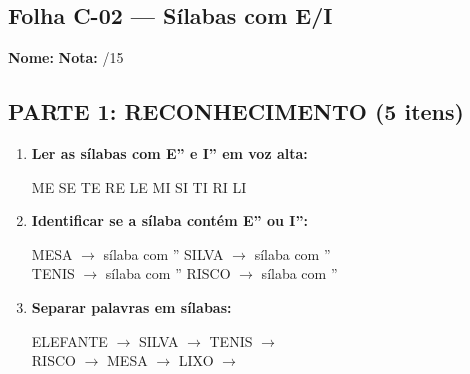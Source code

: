 \subsection{Folha C-02 --- Sílabas com E/I}

\begin{exercicio}

\noindent\textbf{Nome:} \underline{\hspace{4cm}} \quad \textbf{Nota:} \underline{\hspace{1cm}}/15

\subsection*{PARTE 1: RECONHECIMENTO (5 itens)}

\begin{enumerate}
  \item \textbf{Ler as sílabas com E'' e I'' em voz alta:}
  \begin{center}
  ME \quad SE \quad TE \quad RE \quad LE \quad MI \quad SI \quad TI \quad RI \quad LI
  \end{center}

  \item \textbf{Identificar se a sílaba contém E'' ou I'':}
  \begin{center}
  MESA $\rightarrow$ sílaba com \underline{\hspace{1cm}}'' \quad SILVA $\rightarrow$ sílaba com \underline{\hspace{1cm}}'' \\
  TENIS $\rightarrow$ sílaba com \underline{\hspace{1cm}}'' \quad RISCO $\rightarrow$ sílaba com \underline{\hspace{1cm}}''
  \end{center}

  \item \textbf{Separar palavras em sílabas:}
  \begin{center}
  ELEFANTE $\rightarrow$ \underline{\hspace{1.5cm}} \quad SILVA $\rightarrow$ \underline{\hspace{1.5cm}} \quad TENIS $\rightarrow$ \underline{\hspace{1.5cm}} \\
  RISCO $\rightarrow$ \underline{\hspace{1.5cm}} \quad MESA $\rightarrow$ \underline{\hspace{1.5cm}} \quad LIXO $\rightarrow$ \underline{\hspace{1.5cm}}
  \end{center}


\end{enumerate}
\end{exercicio}
